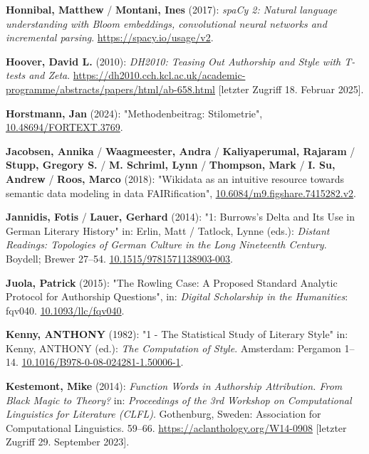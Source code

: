 \documentclass[
  12pt,
  letterpaper,
  DIV=11,
  numbers=noendperiod]{scrreprt}
\newlength{\cslhangindent}
\newenvironment{CSLReferences}[2] %
 {\begin{list}{}{%
  \setlength{\itemindent}{0pt}
  \setlength{\leftmargin}{0pt}
  \setlength{\parsep}{0pt}
  \ifodd #1
   \setlength{\leftmargin}{\cslhangindent}
   \setlength{\itemindent}{-1\cslhangindent}
  \fi
  \setlength{\itemsep}{#2\baselineskip}}}
 {\end{list}}
\begin{document}
\begin{CSLReferences}{1}{0}
\textbf{Honnibal, Matthew} / \textbf{Montani, Ines} (2017):
\emph{{spaCy} 2: {Natural} language understanding with {Bloom}
embeddings, convolutional neural networks and incremental parsing}.
\url{https://spacy.io/usage/v2}.

\textbf{Hoover, David L.} (2010): \emph{{DH2010}: {Teasing} {Out}
{Authorship} and {Style} with {T}-tests and {Zeta}}.
\url{https://dh2010.cch.kcl.ac.uk/academic-programme/abstracts/papers/html/ab-658.html}
{[}letzter Zugriff 18. Februar 2025{]}.

\textbf{Horstmann, Jan} (2024): "Methodenbeitrag: {Stilometrie}",
\href{https://doi.org/10.48694/FORTEXT.3769}{10.48694/FORTEXT.3769}.

\textbf{Jacobsen, Annika} / \textbf{Waagmeester, Andra} /
\textbf{Kaliyaperumal, Rajaram} / \textbf{Stupp, Gregory S.} /
\textbf{M. Schriml, Lynn} / \textbf{Thompson, Mark} / \textbf{I. Su,
Andrew} / \textbf{Roos, Marco} (2018): "Wikidata as an intuitive
resource towards semantic data modeling in data {FAIRification}",
\href{https://doi.org/10.6084/m9.figshare.7415282.v2}{10.6084/m9.figshare.7415282.v2}.

\textbf{Jannidis, Fotis} / \textbf{Lauer, Gerhard} (2014): "1:
{Burrows}'s {Delta} and {Its} {Use} in {German} {Literary} {History}"
in: Erlin, Matt / Tatlock, Lynne (eds.): \emph{Distant {Readings}:
{Topologies} of {German} {Culture} in the {Long} {Nineteenth}
{Century}}. Boydell; Brewer 27--54.
\href{https://doi.org/10.1515/9781571138903-003}{10.1515/9781571138903-003}.

\textbf{Juola, Patrick} (2015): "The {Rowling} {Case}: {A} {Proposed}
{Standard} {Analytic} {Protocol} for {Authorship} {Questions}", in:
\emph{Digital Scholarship in the Humanities}: fqv040.
\href{https://doi.org/10.1093/llc/fqv040}{10.1093/llc/fqv040}.

\textbf{Kenny, ANTHONY} (1982): "1 - {The} {Statistical} {Study} of
{Literary} {Style}" in: Kenny, ANTHONY (ed.): \emph{The {Computation} of
{Style}}. Amsterdam: Pergamon 1--14.
\href{https://doi.org/10.1016/B978-0-08-024281-1.50006-1}{10.1016/B978-0-08-024281-1.50006-1}.

\textbf{Kestemont, Mike} (2014): \emph{Function {Words} in {Authorship}
{Attribution}. {From} {Black} {Magic} to {Theory}?} in:
\emph{Proceedings of the 3rd {Workshop} on {Computational} {Linguistics}
for {Literature} ({CLFL})}. Gothenburg, Sweden: Association for
Computational Linguistics. 59--66.
\url{https://aclanthology.org/W14-0908} {[}letzter Zugriff 29. September
2023{]}.


\end{CSLReferences}
\end{document}
